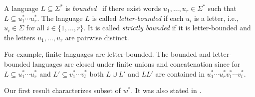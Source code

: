
A language $L \subseteq \Sigma^*$ is \emph{bounded}~\cite{Ginsburg1964BOUNDEDAL}
if there exist words $u_1, \ldots, u_r \in \Sigma^*$ such that
$
L \subseteq u_1^* \cdots u_r^*.
$
The language $L$ is called \emph{letter-bounded} if each $u_i$ is a letter, i.e.,
$u_i \in \Sigma$ for all $i \in \{1,\ldots,r\}$.
It is called \emph{strictly bounded} if it is letter-bounded and the letters
$u_1,\ldots,u_r$ are pairwise distinct.

For example, finite languages are letter-bounded.
The bounded and letter-bounded languages
are closed under finite unions and concatenation
since for $L \subseteq u_1^* \cdots u_r^*$
and $L' \subseteq v_1^* \cdots v_l^*$
both $L\cup L'$ and $LL'$ are contained in $u_1^* \cdots u_r^*v_1^* \cdots v_l^*$.

Our first result characterizes subset of $w^*$. It
was also stated in \cite[Lem.~5.2]{Ginsburg1964BOUNDEDAL}.

